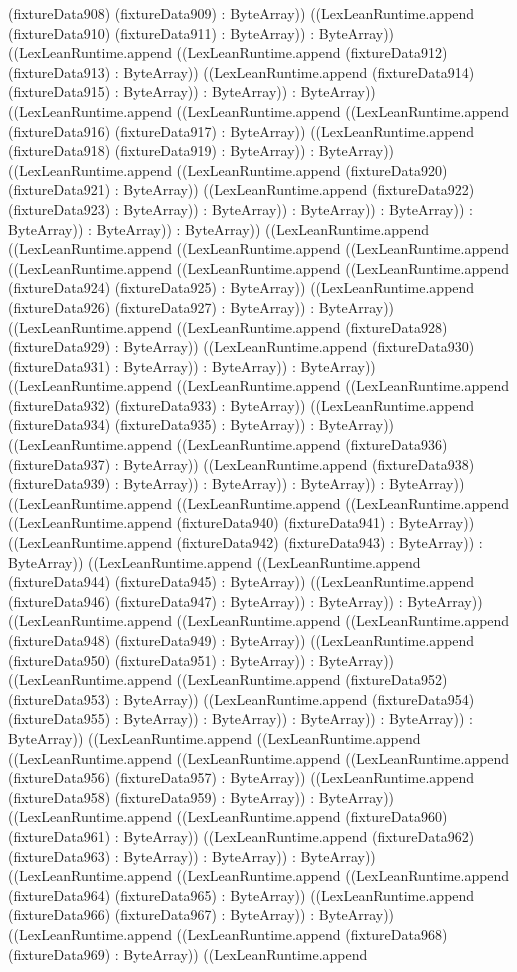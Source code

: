 \documentclass[11pt]{article}
\begin{document}
(fixtureData908) (fixtureData909) : ByteArray)) ((LexLeanRuntime.append (fixtureData910) (fixtureData911) : ByteArray)) : ByteArray)) ((LexLeanRuntime.append ((LexLeanRuntime.append (fixtureData912) (fixtureData913) : ByteArray)) ((LexLeanRuntime.append (fixtureData914) (fixtureData915) : ByteArray)) : ByteArray)) : ByteArray)) ((LexLeanRuntime.append ((LexLeanRuntime.append ((LexLeanRuntime.append (fixtureData916) (fixtureData917) : ByteArray)) ((LexLeanRuntime.append (fixtureData918) (fixtureData919) : ByteArray)) : ByteArray)) ((LexLeanRuntime.append ((LexLeanRuntime.append (fixtureData920) (fixtureData921) : ByteArray)) ((LexLeanRuntime.append (fixtureData922) (fixtureData923) : ByteArray)) : ByteArray)) : ByteArray)) : ByteArray)) : ByteArray)) : ByteArray)) : ByteArray)) ((LexLeanRuntime.append ((LexLeanRuntime.append ((LexLeanRuntime.append ((LexLeanRuntime.append ((LexLeanRuntime.append ((LexLeanRuntime.append ((LexLeanRuntime.append (fixtureData924) (fixtureData925) : ByteArray)) ((LexLeanRuntime.append (fixtureData926) (fixtureData927) : ByteArray)) : ByteArray)) ((LexLeanRuntime.append ((LexLeanRuntime.append (fixtureData928) (fixtureData929) : ByteArray)) ((LexLeanRuntime.append (fixtureData930) (fixtureData931) : ByteArray)) : ByteArray)) : ByteArray)) ((LexLeanRuntime.append ((LexLeanRuntime.append ((LexLeanRuntime.append (fixtureData932) (fixtureData933) : ByteArray)) ((LexLeanRuntime.append (fixtureData934) (fixtureData935) : ByteArray)) : ByteArray)) ((LexLeanRuntime.append ((LexLeanRuntime.append (fixtureData936) (fixtureData937) : ByteArray)) ((LexLeanRuntime.append (fixtureData938) (fixtureData939) : ByteArray)) : ByteArray)) : ByteArray)) : ByteArray)) ((LexLeanRuntime.append ((LexLeanRuntime.append ((LexLeanRuntime.append ((LexLeanRuntime.append (fixtureData940) (fixtureData941) : ByteArray)) ((LexLeanRuntime.append (fixtureData942) (fixtureData943) : ByteArray)) : ByteArray)) ((LexLeanRuntime.append ((LexLeanRuntime.append (fixtureData944) (fixtureData945) : ByteArray)) ((LexLeanRuntime.append (fixtureData946) (fixtureData947) : ByteArray)) : ByteArray)) : ByteArray)) ((LexLeanRuntime.append ((LexLeanRuntime.append ((LexLeanRuntime.append (fixtureData948) (fixtureData949) : ByteArray)) ((LexLeanRuntime.append (fixtureData950) (fixtureData951) : ByteArray)) : ByteArray)) ((LexLeanRuntime.append ((LexLeanRuntime.append (fixtureData952) (fixtureData953) : ByteArray)) ((LexLeanRuntime.append (fixtureData954) (fixtureData955) : ByteArray)) : ByteArray)) : ByteArray)) : ByteArray)) : ByteArray)) ((LexLeanRuntime.append ((LexLeanRuntime.append ((LexLeanRuntime.append ((LexLeanRuntime.append ((LexLeanRuntime.append (fixtureData956) (fixtureData957) : ByteArray)) ((LexLeanRuntime.append (fixtureData958) (fixtureData959) : ByteArray)) : ByteArray)) ((LexLeanRuntime.append ((LexLeanRuntime.append (fixtureData960) (fixtureData961) : ByteArray)) ((LexLeanRuntime.append (fixtureData962) (fixtureData963) : ByteArray)) : ByteArray)) : ByteArray)) ((LexLeanRuntime.append ((LexLeanRuntime.append ((LexLeanRuntime.append (fixtureData964) (fixtureData965) : ByteArray)) ((LexLeanRuntime.append (fixtureData966) (fixtureData967) : ByteArray)) : ByteArray)) ((LexLeanRuntime.append ((LexLeanRuntime.append (fixtureData968) (fixtureData969) : ByteArray)) ((LexLeanRuntime.append 
\end{document}
